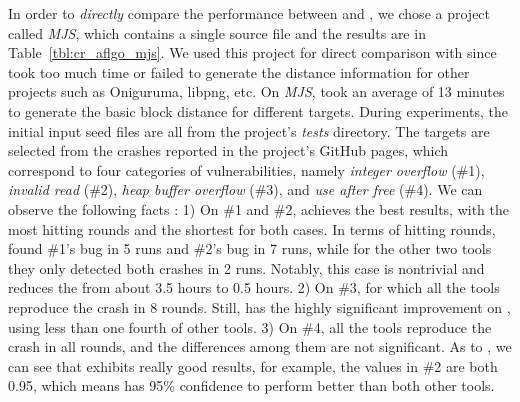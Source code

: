 In order to \emph{directly} compare the performance between {\dFOT} and {\aflgo}, we chose a project called \emph{MJS}, which contains a single source file and the results are in Table~\ref{tbl:cr_aflgo_mjs}.
We used this project for direct comparison with \aflgo since \aflgo took too much time or failed to generate the distance information for other projects such as Oniguruma, libpng, etc. 
On \emph{MJS}, \aflgo took an average of 13 minutes to generate the basic block distance for different targets.
During experiments, the initial input seed files are all from the project's \emph{tests} directory. The targets are selected from the crashes reported in the project's GitHub pages, which correspond to four categories of vulnerabilities, namely \emph{integer overflow} (\#1), \emph{invalid read} (\#2), \emph{heap buffer overflow} (\#3), and \emph{use after free} (\#4). We can observe the following facts : 
1) On \#1 and \#2,  \dFOT achieves the best results, with the most hitting rounds and the shortest {\utte} for both cases.  In terms of hitting rounds, {\dFOT} found \#1's bug in 5 runs and \#2's bug in 7 runs, while for the other two tools they only detected both crashes in 2 runs. Notably, this case is nontrivial and {\dFOT} reduces the {\utte} from about 3.5 hours to 0.5 hours.
2) On \#3, for which all the tools reproduce the crash in 8 rounds. Still, \dFOT has the highly significant improvement on {\utte}, using less than one fourth {\utte} of other tools.
3) On \#4, all the tools reproduce the crash in all rounds, and the {\utte} differences among them are not significant.
As to \alz, we can see that \dFOT exhibits really good results, for  example, the values in \#2 are both 0.95, which means \dFOT has 95\% confidence to perform better than both other tools.



